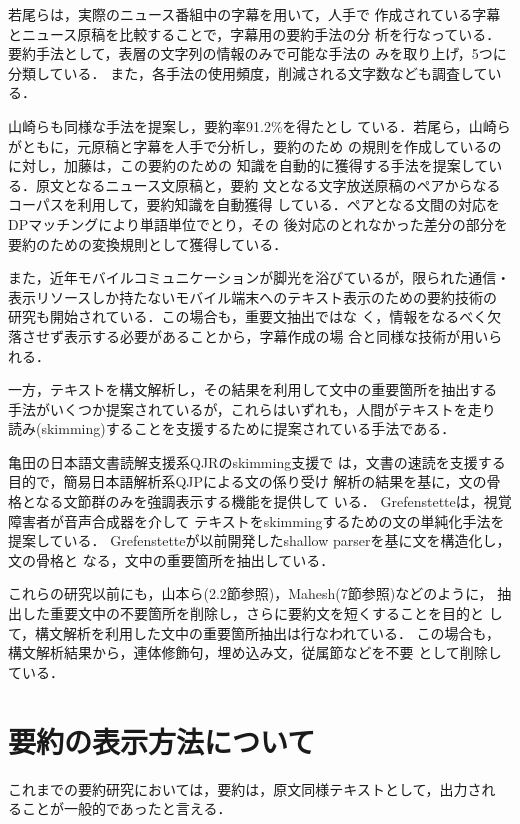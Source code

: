 若尾ら\cite{wakao:97:b}は，実際のニュース番組中の字幕を用いて，人手で
作成されている字幕とニュース原稿を比較することで，字幕用の要約手法の分
析を行なっている．要約手法として，表層の文字列の情報のみで可能な手法の
みを取り上げ，5つに分類している．
また，各手法の使用頻度，削減される文字数なども調査している．

山崎ら\cite{yamazaki:98:a}も同様な手法を提案し，要約率91.2\%を得たとし
ている．若尾ら，山崎らがともに，元原稿と字幕を人手で分析し，要約のため
の規則を作成しているのに対し，加藤\cite{kato:98:b}は，この要約のための
知識を自動的に獲得する手法を提案している．原文となるニュース文原稿と，要約
文となる文字放送原稿のペアからなるコーパスを利用して，要約知識を自動獲得
している．ペアとなる文間の対応をDPマッチングにより単語単位でとり，その
後対応のとれなかった差分の部分を要約のための変換規則として獲得している．

また，近年モバイルコミュニケーションが脚光を浴びているが，限られた通信・
表示リソースしか持たないモバイル端末へのテキスト表示のための要約技術の
研究も開始されている\cite{inagaki:98:a}．この場合も，重要文抽出ではな
く，情報をなるべく欠落させず表示する必要があることから，字幕作成の場
合と同様な技術が用いられる．

一方，テキストを構文解析し，その結果を利用して文中の重要箇所を抽出する
手法がいくつか提案されているが，これらはいずれも，人間がテキストを走り
読み(skimming)することを支援するために提案されている手法である．

亀田\cite{kameda:95:a}の日本語文書読解支援系QJRのskimming支援で
は，文書の速読を支援する目的で，簡易日本語解析系QJPによる文の係り受け
解析の結果を基に，文の骨格となる文節群のみを強調表示する機能を提供して
いる．
Grefenstette\cite{grefenstette:98:a}は，視覚障害者が音声合成器を介して
テキストをskimmingするための文の単純化手法を提案している．
Grefenstetteが以前開発したshallow parserを基に文を構造化し，文の骨格と
なる，文中の重要箇所を抽出している．

これらの研究以前にも，山本ら(2.2節参照)，Mahesh(7節参照)などのように，
抽出した重要文中の不要箇所を削除し，さらに要約文を短くすることを目的と
して，構文解析を利用した文中の重要箇所抽出は行なわれている．
この場合も，構文解析結果から，連体修飾句，埋め込み文，従属節などを不要
として削除している．

\section{要約の表示方法について}

これまでの要約研究においては，要約は，原文同様テキストとして，出力され
ることが一般的であったと言える．

